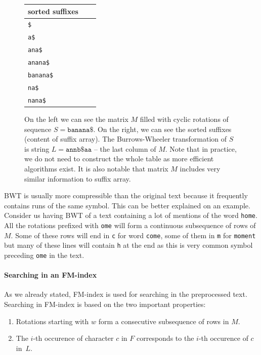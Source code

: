 \begin{figure}
{	\begin{tabular}{l l l}
		sorted suffixes\\
	\hline
		\tt \$ \\
		\tt a\$ \\
		\tt ana\$ \\
		\tt anana\$ \\
		\tt banana\$ \\
		\tt na\$ \\
		\tt nana\$ \\
	\end{tabular}
	}
	\caption[TODO]{On the left we can see the matrix $M$ filled with cyclic rotations of sequence
	$S = \mathtt{banana\$}$. On the right, we can see the sorted suffixes (content of suffix array). The
	Burrows-Wheeler transformation of $S$ is string $L=\mathtt{annb\$aa}$ -- the last column of $M$.
	Note that in practice, we do not need to construct the whole table as more efficient algorithms exist.
	It is also notable that matrix $M$ includes very similar information to suffix array.
	}
	\label{obr:BWT}
\end{figure}

BWT is usually more compressible than the original text because it frequently contains runs of the same
symbol. This can be better explained on an example. Consider us having BWT of a text containing
a lot of mentions of the word {\tt home}. All the rotations prefixed with {\tt ome} will form a
continuous subsequence of rows of $M$. Some of these rows will end in {\tt c} for word {\tt come},
some of them in {\tt m} for {\tt moment} but many of these lines will contain {\tt h} at the end as this
is very common symbol preceding {\tt ome} in the text.

\paragraph{Searching in an FM-index}

As we already stated, FM-index is used for searching in the preprocessed text.
Searching in FM-index is based on the two important properties:

\begin{enumerate}
	\item Rotations starting with $w$ form a consecutive subsequence of rows in $M$.
	\label{chapter1:fmindexprop:prop1}
	\item The $i$-th occurence of character $c$ in $F$ corresponds to the $i$-th occurence of $c$ in~$L$.
	\label{chapter1:fmindexprop:prop2}
\end{enumerate}

